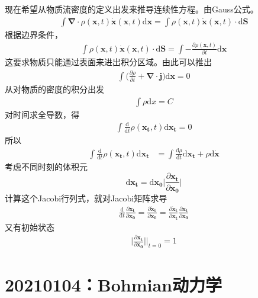 \documentclass[12pt]{article}
\begin{document}
    现在希望从物质流密度的定义出发来推导连续性方程。由Gauss公式。
    \begin{align*}
        \int \bm{\nabla} \cdot \rho(\bm{x},t) \bm{\dot{x}}(\bm{x},t) \mathrm{d}\bm{x} = \int \rho(\bm{x},t) \bm{\dot{x}}(\bm{x},t) \cdot \mathrm{d}\bm{S}
    \end{align*}
    根据边界条件，
    \begin{align*}
        \int \rho(\bm{x},t) \bm{\dot{x}}(\bm{x},t) \cdot \mathrm{d}\bm{S} = \int -\frac {\partial \rho(\bm{x},t)}{\partial t} \mathrm{d}\bm{x}
    \end{align*}
    这要求物质只能通过表面来进出积分区域。由此可以推出
    \begin{align*}
        \int \bigg(\frac {\partial \rho}{\partial t} + \bm{\nabla \cdot j}\bigg) \mathrm{d}\bm{x} = 0 
    \end{align*}
    从对物质的密度的积分出发
    \begin{align*}
        \int \rho \mathrm{d}x = C
    \end{align*}
    对时间求全导数，得
    \begin{align*}
        \int \frac {\mathrm{d}}{\mathrm{d}t}\rho(\bm{x_t},t)\mathrm{d}\bm{x_t} = 0
    \end{align*}
    所以
    \begin{align*}
    \int \frac {\mathrm{d}}{\mathrm{d}t}\rho(\bm{x_t},t)\mathrm{d}\bm{x_t} &= \int \frac {\mathrm{d}\rho}{\mathrm{d}t}\mathrm{d}\bm{x_t} + \rho \mathrm{d}\bm{\dot{x}}
    \end{align*}
    考虑不同时刻的体积元
    \begin{equation*}
        \mathrm{d}\bm{x_t} = \mathrm{d}\bm{x_0} \bigg|\frac {\partial \bm{x_t}}{\partial \bm{x_0}}\bigg|
    \end{equation*}
    计算这个Jacobi行列式，就对Jacobi矩阵求导
    \begin{align*}
        \frac {\mathrm{d}}{\mathrm{d}t} \frac {\partial \bm{x_t}}{\partial \bm{x_0}} = \frac {\partial \bm{\dot{x}_t}}{\partial \bm{x_0}} = \frac {\partial \bm{\dot{x}_t}}{\partial \bm{x_t}} \frac {\partial \bm{x_t}}{\partial \bm{x_0}}
    \end{align*}
    又有初始状态
    \begin{align*}
        \bigg|\frac {\partial \bm{x_t}}{\partial \bm{x_0}} \bigg|\Bigg|_{t=0} = 1
    \end{align*}

    \section{20210104：Bohmian动力学}
\end{document}
